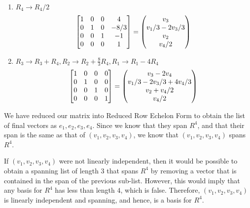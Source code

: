 \documentclass{article}
\begin{document}
\begin{enumerate}[(Step 1): ]
    \item $R_4 \to R_4/2$
          \[ \begin{bmatrix}
                  1 & 0 & 0 & 4    \\
                  0 & 1 & 0 & -8/3 \\
                  0 & 0 & 1 & -1   \\
                  0 & 0 & 0 & 1
              \end{bmatrix} = \begin{pmatrix}
                  v_3            \\
                  v_1/3 - 2v_3/3 \\
                  v_2            \\
                  v_4/2
              \end{pmatrix}\\ \]
    \item $R_3 \to R_3+R_4, R_2 \to R_2 + \frac{8}{3}R_4, R_1 \to R_1 - 4R_4$
          \[ \begin{bmatrix}
                  1 & 0 & 0 & 0 \\
                  0 & 1 & 0 & 0 \\
                  0 & 0 & 1 & 0 \\
                  0 & 0 & 0 & 1
              \end{bmatrix} = \begin{pmatrix}
                  v_3 - 2v_4              \\
                  v_1/3 - 2v_3/3 + 4v_4/3 \\
                  v_2 + v_4/2             \\
                  v_4/2
              \end{pmatrix}\\ \]
\end{enumerate}

We have reduced our matrix into Reduced Row Echelon Form to obtain the list of final vectors as $e_1, e_2, e_3, e_4$. Since we know that they span $R^4$, and that their span is the same as that of $(v_1, v_2, v_3, v_4)$, we know that $(v_1, v_2, v_3, v_4)$ spans $R^4$.

If $(v_1, v_2, v_3, v_4)$ were not linearly independent, then it would be possible to obtain a spanning list of length $3$ that spans $R^4$ by removing a vector that is contained in the span of the previous sub-list. However, this would imply that any basis for $R^4$ has less than length $4$, which is false. Therefore, $(v_1, v_2, v_3, v_4)$ is linearly independent and spanning, and hence, is a basis for $R^4$.
\end{document}
